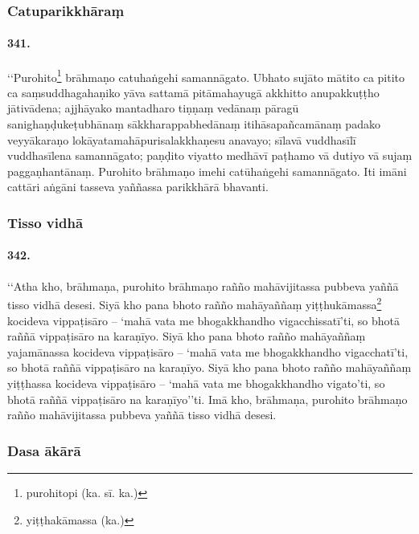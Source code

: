 \subsubsection{Catuparikkhāraṃ}

\paragraph{341.} ‘‘Purohito\footnote{purohitopi (ka. sī. ka.)} brāhmaṇo catuhaṅgehi samannāgato. Ubhato sujāto mātito ca pitito ca saṃsuddhagahaṇiko yāva sattamā pitāmahayugā akkhitto anupakkuṭṭho jātivādena; ajjhāyako mantadharo tiṇṇaṃ vedānaṃ pāragū sanighaṇḍukeṭubhānaṃ sākkharappabhedānaṃ itihāsapañcamānaṃ padako veyyākaraṇo lokāyatamahāpurisalakkhaṇesu anavayo; sīlavā vuddhasīlī vuddhasīlena samannāgato; paṇḍito viyatto medhāvī paṭhamo vā dutiyo vā sujaṃ paggaṇhantānaṃ. Purohito brāhmaṇo imehi catūhaṅgehi samannāgato. Iti imāni cattāri aṅgāni tasseva yaññassa parikkhārā bhavanti.

\subsubsection{Tisso vidhā}

\paragraph{342.} ‘‘Atha kho, brāhmaṇa, purohito brāhmaṇo rañño mahāvijitassa pubbeva yaññā tisso vidhā desesi. Siyā kho pana bhoto rañño mahāyaññaṃ yiṭṭhukāmassa\footnote{yiṭṭhakāmassa (ka.)} kocideva vippaṭisāro – ‘mahā vata me bhogakkhandho vigacchissatī’ti, so bhotā raññā vippaṭisāro na karaṇīyo. Siyā kho pana bhoto rañño mahāyaññaṃ yajamānassa kocideva vippaṭisāro – ‘mahā vata me bhogakkhandho vigacchatī’ti, so bhotā raññā vippaṭisāro na karaṇīyo. Siyā kho pana bhoto rañño mahāyaññaṃ yiṭṭhassa kocideva vippaṭisāro – ‘mahā vata me bhogakkhandho vigato’ti, so bhotā raññā vippaṭisāro na karaṇīyo’’ti. Imā kho, brāhmaṇa, purohito brāhmaṇo rañño mahāvijitassa pubbeva yaññā tisso vidhā desesi.

\subsubsection{Dasa ākārā}

